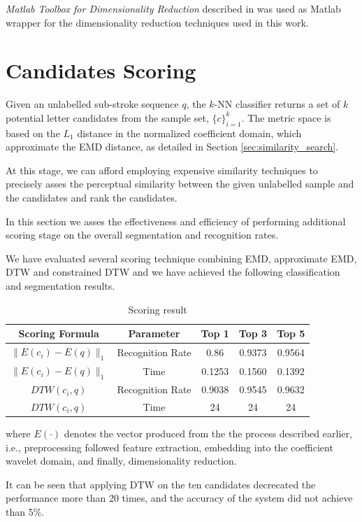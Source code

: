 \iftoggle{edit-mode}{\hspace{0pt}\marginpar{The DR package}}{}
\emph{Matlab Toolbox for Dimensionality Reduction} described in \cite{van2007introduction} was used as Matlab wrapper for the dimensionality reduction techniques used in this work.

\newpage{}


\section{Candidates Scoring}
\label{sec:candidates_scoring}

\iftoggle{edit-mode}{\hspace{0pt}\marginpar{The input for this stage}}{}
Given an unlabelled sub-stroke sequence $q$, the $k$-NN classifier returns a set of $k$ potential letter candidates from the sample set, $\{c\}_{i=1}^{k}$.
The metric space is based on the $L_1$ distance in the normalized coefficient domain, which approximate the EMD distance, as detailed in Section \ref{sec:similarity_search}.  

At this stage, we can afford employing expensive similarity techniques to precisely asses the perceptual similarity between the given unlabelled sample and the candidates and rank the candidates.

In this section we asses the effectiveness and efficiency of performing additional scoring stage on the overall segmentation and recognition rates.

We have evaluated several scoring technique combining EMD, approximate EMD, DTW and constrained DTW and we have achieved the following classification and segmentation results.

\begin{table}
\centering
\begin{tabular}{ | c | c | c | c | c |}
\hline
Scoring Formula & Parameter & Top 1 & Top 3 & Top 5\\
\hline
  $\|E(c_i)-E(q)\|_1$ & Recognition Rate & 0.86 & 0.9373 & 0.9564 \\ 
  \hline
  $\|E(c_i)-E(q)\|_1$ & Time & 0.1253 & 0.1560 & 0.1392 \\
  \hline                 
  $DTW(c_i,q)$ & Recognition Rate & 0.9038 & 0.9545 & 0.9632\\ 
  \hline
  $DTW(c_i,q)$ & Time & 24 & 24 &  24 \\
  \hline
  \end{tabular}
\caption{Scoring result}
\label{table:scoring_results} 
\end{table}
where $E(\cdot)$ denotes the vector produced from the the process described earlier, i.e., preprocessing followed feature extraction, embedding into the coefficient wavelet domain, and finally, dimensionality reduction.

It can be seen that applying DTW on the ten candidates decrecated the performance more than 20 times, and the accuracy of the system did not achieve than 5\%.

  


%
%
%
